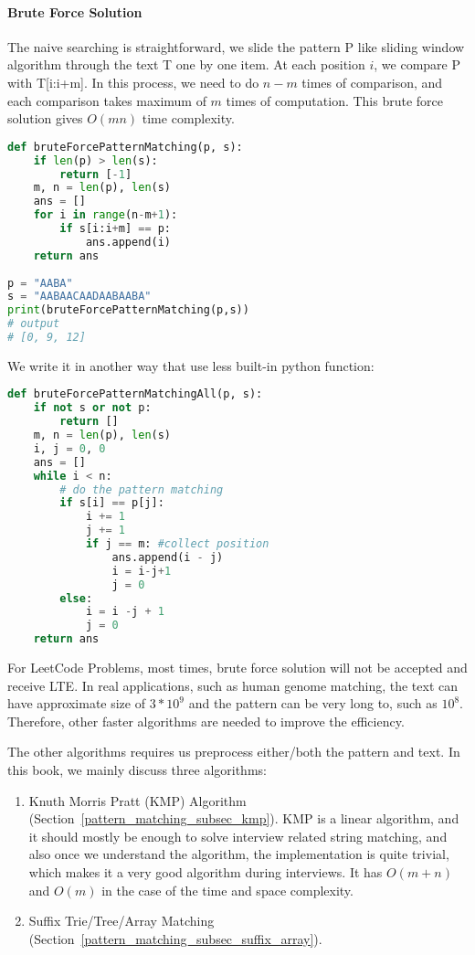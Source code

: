 \documentclass[../main.tex]{subfiles}
\begin{document}
\paragraph{Brute Force Solution} The naive searching is straightforward, we slide the pattern P like sliding window algorithm through the text T one by one item. At each position $i$, we compare P with T[i:i+m]. In this process, we need to do $n-m$ times of comparison, and each comparison takes maximum of $m$ times of computation. This brute force solution gives $O(mn)$ time complexity.
\begin{lstlisting}[language=Python]
def bruteForcePatternMatching(p, s):
    if len(p) > len(s):
        return [-1]
    m, n = len(p), len(s)
    ans = []
    for i in range(n-m+1):
        if s[i:i+m] == p:
            ans.append(i)
    return ans
    
p = "AABA"
s = "AABAACAADAABAABA"
print(bruteForcePatternMatching(p,s))
# output
# [0, 9, 12]
\end{lstlisting}
We write it in another way that use less built-in python function:
\begin{lstlisting}[language=Python]
def bruteForcePatternMatchingAll(p, s):
    if not s or not p:
        return []
    m, n = len(p), len(s)
    i, j = 0, 0
    ans = []
    while i < n:
        # do the pattern matching  
        if s[i] == p[j]:
            i += 1
            j += 1
            if j == m: #collect position
                ans.append(i - j)
                i = i-j+1
                j = 0
        else:
            i = i -j + 1
            j = 0
    return ans
\end{lstlisting}

For LeetCode Problems, most times, brute force solution will not be accepted and receive LTE. In real applications, such as human genome matching, the text can have approximate size of $3*10^9$ and the pattern can be very long to, such as $10^8$. Therefore, other faster algorithms are needed to improve the efficiency. 

The other algorithms requires us preprocess either/both the pattern and text. In this book, we mainly discuss three algorithms:
\begin{enumerate}
    \item Knuth Morris Pratt (KMP) Algorithm (Section~\ref{pattern_matching_subsec_kmp}). KMP is  a linear algorithm, and it should mostly be enough to solve interview related string matching, and also once we understand the algorithm, the implementation is quite trivial, which makes it a very good algorithm during interviews. It has $O(m+n)$ and $O(m)$ in the case of the time and space complexity.
    \item Suffix Trie/Tree/Array Matching (Section~\ref{pattern_matching_subsec_suffix_array}).
\end{enumerate}
\end{document}
